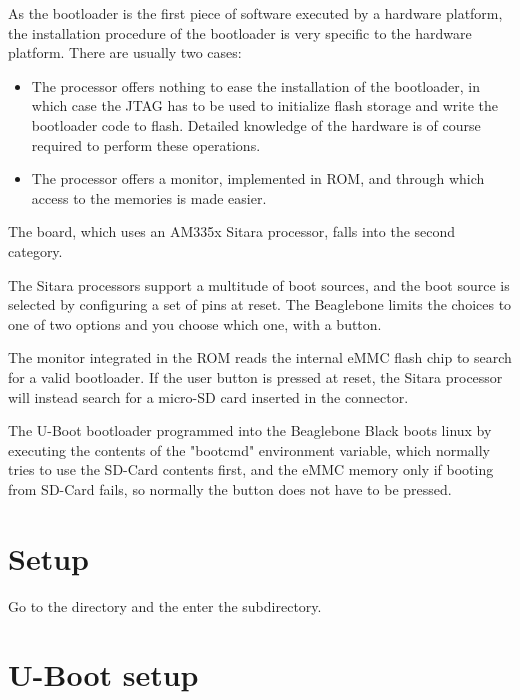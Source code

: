 
As the bootloader is the first piece of software executed by a
hardware platform, the installation procedure of the bootloader is
very specific to the hardware platform. There are usually two cases:

\begin{itemize}

\item The processor offers nothing to ease the installation of the
  bootloader, in which case the JTAG has to be used to initialize
  flash storage and write the bootloader code to flash. Detailed
  knowledge of the hardware is of course required to perform these
  operations.

\item The processor offers a monitor, implemented in ROM, and through
  which access to the memories is made easier.

\end{itemize}

The \devboard board, which uses an AM335x Sitara processor, falls into
the second category. 

The Sitara processors support a multitude of boot sources, and the boot
source is selected by configuring a set of pins at reset.
The Beaglebone limits the choices to one of two options and you choose
which one, with a button.

The monitor integrated in the ROM reads the internal
eMMC flash chip to search for a valid bootloader.
If the user button is pressed at reset, the Sitara processor will instead search
for a micro-SD card inserted in the connector.

The U-Boot bootloader programmed into the Beaglebone Black boots linux
by executing the contents of the "bootcmd" environment variable, 
which normally tries to use the SD-Card contents first, and the eMMC memory
only if booting from SD-Card fails, so normally the button does not have to be pressed.


\clearpage
\section{Setup}

Go to the \labdir directory and the enter the  subdirectory.

\section{U-Boot setup}

